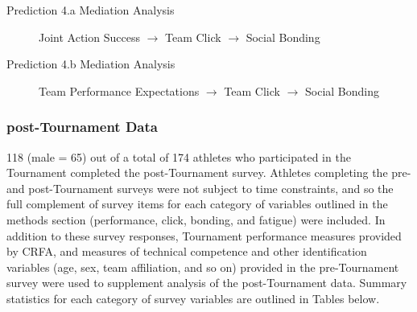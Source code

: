 \begin{description}
\item[Prediction 4.a Mediation Analysis] Joint Action Success $\rightarrow$ Team Click $\rightarrow$ Social Bonding
\item[Prediction 4.b Mediation Analysis] Team Performance Expectations $\rightarrow$ Team Click $\rightarrow$ Social Bonding
\end{description}











\subsubsection{post-Tournament Data}

118 (male = 65) out of a total of 174 athletes who participated in the Tournament completed the post-Tournament survey. Athletes completing the pre- and post-Tournament surveys were not subject to time constraints, and so the full complement of survey items for each category of variables outlined in the methods section (performance, click, bonding, and fatigue) were included. In addition to these survey responses, Tournament performance measures provided by CRFA, and measures of technical competence and other identification variables (age, sex, team affiliation, and so on) provided in the pre-Tournament survey were used to supplement analysis of the post-Tournament data. Summary statistics for each category of survey variables are outlined in Tables below.









